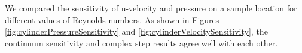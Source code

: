 \documentclass[12pt]{aiaa-pretty}
\begin{document}
We compared the sensitivity of u-velocity and pressure on a sample location for different values of Reynolds numbers. As shown in Figures \ref{fig:cylinderPressureSensitivity} and \ref{fig:cylinderVelocitySensitivity}, the continuum sensitivity and complex step results agree well with each other.

%
\begin{figure}[H]
	\centering
	\quad
	\\
	\quad
	\\

\end{figure}
\end{document}
